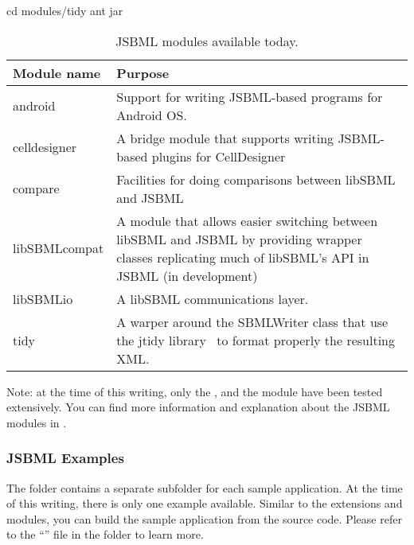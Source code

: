 \begin{example}[style=bash, title={Compiling the JSBML ``\code{layout}'' extension.}]
cd modules/tidy
ant jar
\end{example}

\begin{table}[thb]
  \caption{JSBML modules available today.}
  \label{tab:jsbml-modules}
  \centering
  \begin{tabular}{>{\ttfamily}lp{5.25in}}
    \toprule
    \textbf{\sffamily Module name} & \textbf{Purpose} \\
    \midrule
    android
    & Support for writing JSBML-based programs for Android OS.
    \\
    celldesigner
    & A bridge module that supports writing JSBML-based
    plugins for CellDesigner~\cite{Funahashi2003}
    \\
    compare
    & Facilities for doing comparisons between libSBML and JSBML
    \\
    libSBMLcompat
    & A module that allows easier switching between libSBML and JSBML by
    providing wrapper classes replicating much of libSBML's API in JSBML (in development)
    \\
    libSBMLio
    & A libSBML communications layer.
    \\
    tidy
    & A warper around the SBMLWriter class that use the jtidy library~\cite{jtidy} to
    format properly the resulting XML.
    \\
    \bottomrule
  \end{tabular}
\end{table}

Note: at the time of this writing, only the ,
 and the  module have been
tested extensively.  You can find more information and explanation
about the JSBML modules in .


\subsubsection{JSBML Examples}
\label{sec:jsbml-repo-examples}

The  folder contains a separate subfolder for each sample
application.  At the time of this writing, there is only one example
available.  Similar to the extensions and modules, you can build the sample
application from the source code.  Please refer to the
``'' file in the  folder to
learn more.
